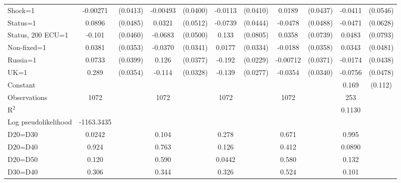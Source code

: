 \begin{tabular}{l|cccccccc|cc}
Shock=1         & -0.00271         & (0.0413)& -0.00493         & (0.0400)&  -0.0113         & (0.0410)&   0.0189         & (0.0437)&  -0.0411         & (0.0546)\\
Status=1        &   0.0896\sym{*}  & (0.0485)&   0.0321         & (0.0512)&  -0.0739\sym{*}  & (0.0444)&  -0.0478         & (0.0488)&  -0.0471         & (0.0628)\\
Status, 200 ECU=1&   -0.101\sym{**} & (0.0460)&  -0.0683         & (0.0500)&    0.133\sym{*}  & (0.0805)&   0.0358         & (0.0739)&   0.0483         & (0.0793)\\
Non-fixed=1     &   0.0381         & (0.0353)&  -0.0370         & (0.0341)&   0.0177         & (0.0334)&  -0.0188         & (0.0358)&   0.0343         & (0.0481)\\
Russia=1        &   0.0733\sym{*}  & (0.0399)&    0.126\sym{***}& (0.0377)&   -0.192\sym{***}& (0.0229)& -0.00712         & (0.0371)&  -0.0174         & (0.0438)\\
UK=1            &    0.289\sym{***}& (0.0354)&   -0.114\sym{***}& (0.0328)&   -0.139\sym{***}& (0.0277)&  -0.0354         & (0.0340)&  -0.0756         & (0.0478)\\
Constant        &                  &         &                  &         &                  &         &                  &         &    0.169         &  (0.112)\\
\hline
Observations    &     1072         &         &     1072         &         &     1072         &         &     1072         &         &      253         &         \\
R$^2$      &                  &         &                  &         &                  &         &           &  & 0.1130 &  \\ 
Log pseudolikelihood  & -1163.3435  &         &                  &         &                  &         &           &   & & \\ 
D20=D30         &   0.0242         &         &    0.104         &         &    0.278         &         &    0.671         &         &    0.995         &         \\
D20=D40         &    0.924         &         &    0.763         &         &    0.126         &         &    0.412         &         &   0.0890         &         \\
D20=D50         &    0.120         &         &    0.590         &         &   0.0442         &         &    0.580         &         &    0.132         &         \\
D30=D40         &    0.306         &         &    0.344         &         &    0.326         &         &    0.524         &         &    0.101         &         \\

\end{tabular}
